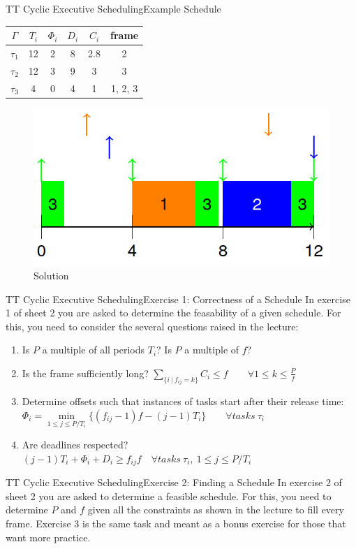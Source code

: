 \begin{frame}{TT Cyclic Executive Scheduling}{Example Schedule}
\begin{center}
    \begin{tabular}{|c||c|c|c|c|c|}
    \hline
    $\Gamma$ & $T_i$ & $\Phi_i$ & $D_i$ & $C_i$ & frame\\
    \hline
    $\tau_1$ & 12 & 2 & 8 & 2.8 & 2\\
    \hline
    $\tau_2$ & 12 & 3 & 9 & 3 & 3\\
    \hline
    $\tau_3$ & 4 & 0 & 4 & 1 & 1, 2, 3\\
    \hline
\end{tabular}
\end{center}
\begin{figure}
    \centering
    \includegraphics[scale=0.25]{figures/schedule_example.png}
    \caption{Solution}
    \label{exampleSolution}
\end{figure}
\end{frame}

\begin{frame}{TT Cyclic Executive Scheduling}{Exercise 1: Correctness of a Schedule}
In exercise 1 of sheet 2 you are asked to determine the feasability of a given schedule. For this, you need to consider the several questions raised in the lecture:
\begin{enumerate}
    \item Is $P$ a multiple of all periods $T_i$? Is $P$ a multiple of $f$?
    \item Is the frame sufficiently long? $\sum\limits_{\{i\ |\ f_{ij}=k\}}C_i \leq f \qquad \forall 1 \leq k \leq \frac{P}{f}$
    \item Determine offsets such that instances of tasks start after their release time: $\Phi_i = \min\limits_{1\leq j\leq P/T_i} \{(f_{ij}-1)f-(j-1)T_i\} \qquad \forall tasks \ \tau_i$
    \item Are deadlines respected? $(j-1)T_i + \Phi_i + D_i \geq f_{ij}f \quad \forall tasks\ \tau_i,\ 1 \leq j \leq P/T_i$
\end{enumerate}
\end{frame}

\begin{frame}{TT Cyclic Executive Scheduling}{Exercise 2: Finding a Schedule}
In exercise 2 of sheet 2 you are asked to determine a feasible schedule. For this, you need to determine $P$ and $f$ given all the constraints as shown in the lecture to fill every frame. Exercise 3 is the same task and meant as a bonus exercise for those that want more practice.
\end{frame}
